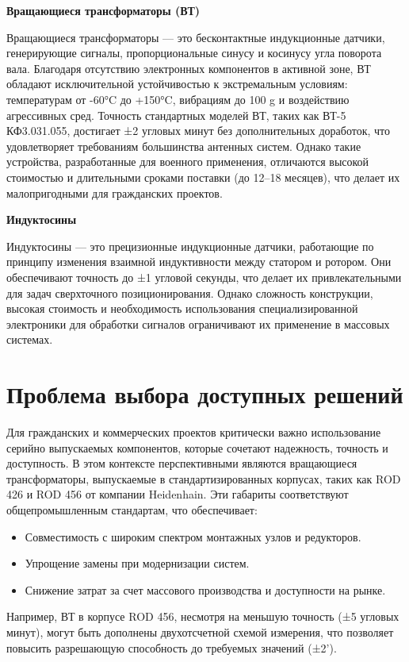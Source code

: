 \textbf{Вращающиеся трансформаторы (ВТ)}

Вращающиеся трансформаторы — это бесконтактные индукционные датчики, генерирующие сигналы, пропорциональные синусу и косинусу угла поворота вала. 
Благодаря отсутствию электронных компонентов в активной зоне, ВТ обладают исключительной устойчивостью к экстремальным условиям: температурам от -60°C до +150°C, 
вибрациям до 100 g и воздействию агрессивных сред.
Точность стандартных моделей ВТ, таких как ВТ-5 КФ3.031.055, достигает ±2 угловых минут без дополнительных доработок, что удовлетворяет требованиям большинства антенных систем. 
Однако такие устройства, разработанные для военного применения, отличаются высокой стоимостью и длительными сроками поставки (до 12–18 месяцев), 
что делает их малопригодными для гражданских проектов.

\textbf{Индуктосины}

Индуктосины — это прецизионные индукционные датчики, работающие по принципу изменения взаимной индуктивности между статором и ротором. Они обеспечивают точность до ±1 угловой секунды, 
что делает их привлекательными для задач сверхточного позиционирования. Однако сложность конструкции, высокая стоимость и необходимость использования специализированной электроники для обработки 
сигналов ограничивают их применение в массовых системах.

\section{Проблема выбора доступных решений}
Для гражданских и коммерческих проектов критически важно использование серийно выпускаемых компонентов, которые сочетают надежность, точность и доступность. 
В этом контексте перспективными являются вращающиеся трансформаторы, выпускаемые в стандартизированных корпусах, таких как ROD 426 и ROD 456 от компании Heidenhain. 
Эти габариты соответствуют общепромышленным стандартам, что обеспечивает:

\begin{itemize} 
  \item Совместимость с широким спектром монтажных узлов и редукторов.
  \item Упрощение замены при модернизации систем.
  \item Снижение затрат за счет массового производства и доступности на рынке.
\end{itemize}

Например, ВТ в корпусе ROD 456, несмотря на меньшую точность (±5 угловых минут), могут быть дополнены двухотсчетной схемой измерения, 
что позволяет повысить разрешающую способность до требуемых значений (±2’).


